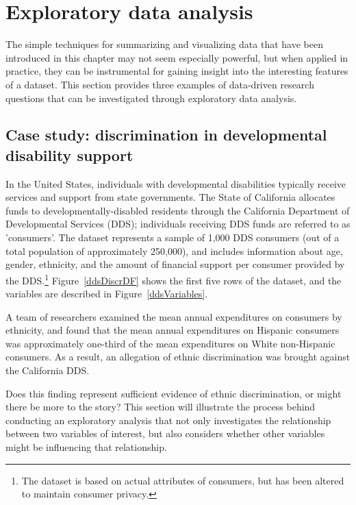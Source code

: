 

\section[Exploratory data analysis]{Exploratory data analysis}
\label{exploratoryDataAnalysis}

The simple techniques for summarizing and visualizing data that have been introduced in this chapter may not seem especially powerful, but when applied in practice, they can be instrumental for gaining insight into the interesting features of a dataset. This section provides three examples of data-driven research questions that can be investigated through exploratory data analysis.


\subsection{Case study: discrimination in developmental disability support}
\label{caseStudyDiscrimination}

In the United States, individuals with developmental disabilities typically receive services and support from state governments. The State of California allocates funds to developmentally-disabled residents through the California Department of Developmental Services (DDS); individuals receiving DDS funds are referred to as 'consumers'. The dataset  represents a sample of 1,000 DDS consumers (out of a total population of approximately 250,000), and includes information about age, gender, ethnicity, and the amount of financial support per consumer provided by the DDS.\footnote{The dataset is based on actual attributes of consumers, but has been altered to maintain consumer privacy.} Figure~\ref{ddsDiscrDF} shows the first five rows of the dataset, and the variables are described in Figure~\ref{ddsVariables}.

A team of researchers examined the mean annual expenditures on consumers by ethnicity, and found that the mean annual expenditures on Hispanic consumers was approximately one-third of the mean expenditures on White non-Hispanic consumers. As a result, an allegation of ethnic discrimination was brought against the California DDS. 

Does this finding represent sufficient evidence of ethnic discrimination, or might there be more to the story? This section will illustrate the process behind conducting an exploratory analysis that not only investigates the relationship between two variables of interest, but also considers whether other variables might be influencing that relationship.

